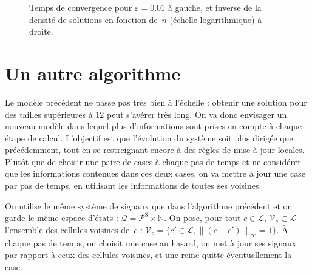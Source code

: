 \documentclass[11pt, openany, a4paper]{article}
\newcommand{\N}{\mathbb{N}}
\newcommand{\norm}[1]{\left\lVert#1\right\rVert}
\newcommand{\La}{\mathcal{L}}
\newcommand{\V}{\mathcal V}
\begin{document}
\begin{figure}
  \quad
  \caption{Temps de convergence pour $\varepsilon=0.01$ à gauche, et inverse de
    la densité de solutions en fonction de~$n$ (échelle logarithmique) à droite.}
  \label{fig:densite}
\end{figure} 


\section{Un autre algorithme}

Le modèle précédent ne passe pas très bien à l'échelle : obtenir une solution pour des tailles supérieures à $12$ peut s'avérer très long. On va donc envisager un nouveau modèle dans lequel plus d'informations sont prises en compte à chaque étape de calcul. L'objectif est que l'évolution du système soit plus dirigée que précédemment, tout en se restreignant encore à des règles de mise à jour locales. Plutôt que de choisir une paire de cases à chaque pas de temps et ne considérer que les informations contenues dans ces deux cases, on va mettre à jour une case par pas de temps, en utilisant les informations de toutes ses voisines. 

On utilise le même système de signaux que dans l'algorithme précédent et on garde le même espace d'états : $\mathcal{Q} = {\mathcal{P}^8}\times\N$. On pose, pour tout $c\in\La$, $\V_c\subset\La$ l'ensemble des cellules voisines de~$c$ : $\V_c = \{c' \in \La, \norm{(c-c')}_\infty = 1\}$.
À chaque pas de temps, on choisit une case au hasard, on met à jour ses signaux par rapport à ceux des cellules voisines, et une reine quitte éventuellement la case. 
\end{document}
